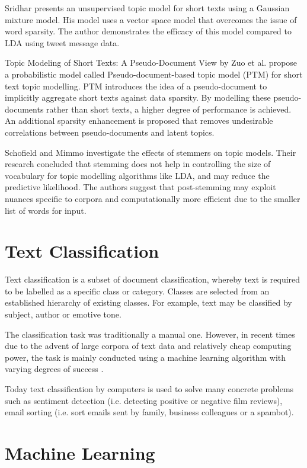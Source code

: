 Sridhar \cite{sridhar2015unsupervised} presents an unsupervised topic model for short texts using a Gaussian mixture model. His model uses a vector space model that overcomes the issue of word sparsity. The author demonstrates the efficacy of this model compared to LDA using tweet message data.

Topic Modeling of Short Texts: A Pseudo-Document View by Zuo et al. \cite{zuo2016topic} propose a probabilistic model called Pseudo-document-based topic model (PTM) for short text topic modelling. PTM introduces the idea of a pseudo-document to implicitly aggregate short texts against data sparsity. By modelling these pseudo-documents rather than short texts, a higher degree of performance is achieved. An additional sparsity enhancement is proposed that removes undesirable correlations between pseudo-documents and latent topics.

Schofield and Mimmo \cite{schofield2016comparing} investigate the effects of stemmers on topic models. Their research concluded that stemming does not help in controlling the size of vocabulary for topic modelling algorithms like LDA, and may reduce the predictive likelihood. The authors suggest that post-stemming may exploit nuances specific to corpora and computationally more efficient due to the smaller list of words for input.

\section{Text Classification}

Text classification is a subset of document classification, whereby text is required to be labelled as a specific class or category. Classes are selected from an established hierarchy of existing classes. For example, text may be classified by subject, author or emotive tone. 

The classification task was traditionally a manual one. However, in recent times due to the advent of large corpora of text data and relatively cheap computing power, the task is mainly conducted using a machine learning algorithm with varying degrees of success \cite{sebastiani2002machine}.  

Today text classification by computers is used to solve many concrete problems such as sentiment detection (i.e. detecting positive or negative film reviews), email sorting (i.e. sort emails sent by family, business colleagues or a spambot).

\section{Machine Learning}

